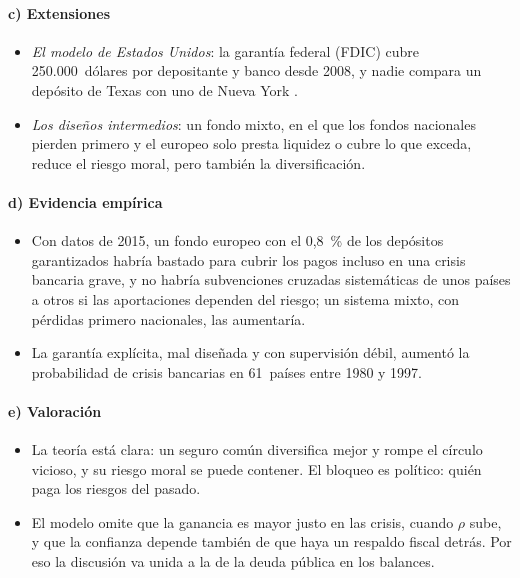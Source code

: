 \documentclass[11pt]{article}
\begin{document}
\paragraph{c) Extensiones}

\begin{itemize}
\item \emph{El modelo de Estados Unidos}: la garantía federal (FDIC) cubre 250.000~dólares por depositante y banco desde 2008, y nadie compara un depósito de Texas con uno de Nueva York .
\item \emph{Los diseños intermedios}: un fondo mixto, en el que los fondos nacionales pierden primero y el europeo solo presta liquidez o cubre lo que exceda, reduce el riesgo moral, pero también la diversificación.
\end{itemize}

\paragraph{d) Evidencia empírica}

\begin{itemize}
\item Con datos de 2015, un fondo europeo con el 0,8~\% de los depósitos garantizados habría bastado para cubrir los pagos incluso en una crisis bancaria grave, y no habría subvenciones cruzadas sistemáticas de unos países a otros si las aportaciones dependen del riesgo; un sistema mixto, con pérdidas primero nacionales, las aumentaría\nocite{CarmassiEtAl2018}.
\item La garantía explícita, mal diseñada y con supervisión débil, aumentó la probabilidad de crisis bancarias en 61~países entre 1980 y 1997\nocite{DemirgucKuntDetragiache2002}.
\end{itemize}

\paragraph{e) Valoración}

\begin{itemize}
\item La teoría está clara: un seguro común diversifica mejor y rompe el círculo vicioso, y su riesgo moral se puede contener. El bloqueo es político: quién paga los riesgos del pasado.
\item El modelo omite que la ganancia es mayor justo en las crisis, cuando $\rho$ sube, y que la confianza depende también de que haya un respaldo fiscal detrás. Por eso la discusión va unida a la de la deuda pública en los balances.
\end{itemize}
\end{document}
